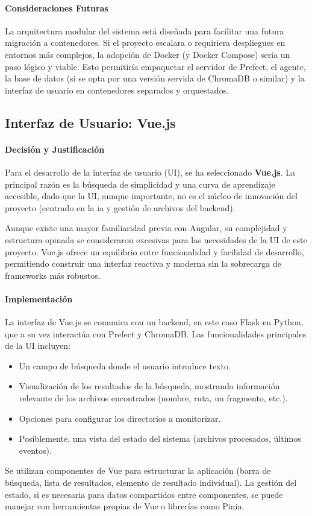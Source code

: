 \paragraph{Consideraciones Futuras}
La arquitectura modular del sistema está diseñada para facilitar una futura migración a contenedores. Si el proyecto escalara o requiriera despliegues en entornos más complejos, la adopción de Docker (y Docker Compose) sería un paso lógico y viable. Esto permitiría empaquetar el servidor de Prefect, el agente, la base de datos (si se opta por una versión servida de ChromaDB o similar) y la interfaz de usuario en contenedores separados y orquestados.

\subsection{Interfaz de Usuario: Vue.js}
\label{subsec:decision_vue}
\paragraph{Decisión y Justificación}
Para el desarrollo de la interfaz de usuario (UI), se ha seleccionado \textbf{Vue.js}. La principal razón es la búsqueda de simplicidad y una curva de aprendizaje accesible, dado que la UI, aunque importante, no es el núcleo de innovación del proyecto (centrado en la \gls{ia} y gestión de archivos del backend).

Aunque existe una mayor familiaridad previa con Angular, su complejidad y estructura opinada se consideraron excesivas para las necesidades de la UI de este proyecto. Vue.js ofrece un equilibrio entre funcionalidad y facilidad de desarrollo, permitiendo construir una interfaz reactiva y moderna sin la sobrecarga de frameworks más robustos.

\paragraph{Implementación}
La interfaz de Vue.js se comunica con un backend, en este caso Flask en Python, que a su vez interactúa con Prefect y ChromaDB. Las funcionalidades principales de la UI incluyen:
\begin{itemize}
    \item Un campo de búsqueda donde el usuario introduce texto.
    \item Visualización de los resultados de la búsqueda, mostrando información relevante de los archivos encontrados (nombre, ruta, un fragmento, etc.).
    \item Opciones para configurar los directorios a monitorizar.
    \item Posiblemente, una vista del estado del sistema (archivos procesados, últimos eventos).
\end{itemize}
Se utilizan componentes de Vue para estructurar la aplicación (barra de búsqueda, lista de resultados, elemento de resultado individual). La gestión del estado, si es necesaria para datos compartidos entre componentes, se puede manejar con herramientas propias de Vue o librerías como Pinia.

